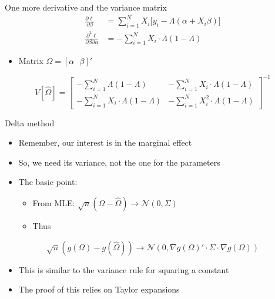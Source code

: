 \documentclass[
  ignorenonframetext,
]{beamer}
\providecommand{\tightlist}{%
  \setlength{\itemsep}{0pt}\setlength{\parskip}{0pt}}
\begin{document}
\begin{frame}{One more derivative and the variance matrix}
\protect{}\label{one-more-derivative-and-the-variance-matrix}
\[
\begin{split}
\frac{\partial \ell}{\partial \beta} &= \sum_{i=1}^N X_i \big[y_i - \Lambda(\alpha + X_i \beta) \big]  \\
\frac{\partial^2 \ell}{\partial \beta \partial \alpha} &= - \sum_{i=1}^N X_i \cdot \Lambda(1-\Lambda)
\end{split}
\]

\begin{itemize}
\tightlist
\item
  Matrix \(\Omega = [\alpha \text{ } \beta]'\)
\end{itemize}

\[
V[\hat\Omega] = \begin{bmatrix}
- \sum_{i=1}^N \Lambda(1-\Lambda) &  - \sum_{i=1}^N X_i \cdot \Lambda(1-\Lambda) \\
- \sum_{i=1}^N X_i \cdot \Lambda(1-\Lambda) & - \sum_{i=1}^N X_i^2 \cdot \Lambda(1-\Lambda)
\end{bmatrix}^{-1}
\]
\end{frame}

\begin{frame}{Delta method}
\protect{}\label{delta-method}
\begin{itemize}
\tightlist
\item
  Remember, our interest is in the marginal effect
\item
  So, we need its variance, not the one for the parameters
\item
  The basic point:

  \begin{itemize}
  \tightlist
  \item
    From MLE:
    \(\sqrt{n}(\Omega - \hat\Omega) \rightarrow \mathcal{N}(0,\Sigma)\)
  \item
    Thus
  \end{itemize}
\end{itemize}

\[
\sqrt{n}\left(g(\Omega) - g\left(\hat\Omega \right) \right) \rightarrow \mathcal{N}\left(0,\nabla g(\Omega)' \cdot \Sigma \cdot \nabla g(\Omega)\right)
\]

\begin{itemize}
\tightlist
\item
  This is similar to the variance rule for squaring a constant
\item
  The proof of this relies on Taylor expansions
\end{itemize}
\end{frame}
\end{document}

